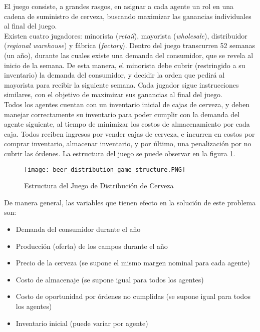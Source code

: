 El juego consiste, a grandes rasgos, en asignar a cada agente un rol en una cadena de suministro de cerveza, buscando maximizar las ganancias individuales al final del juego.\\

Existen cuatro jugadores: minorista (\textit{retail}), mayorista (\textit{wholesale}), distribuidor (\textit{regional warehouse}) y f\'abrica (\textit{factory}). Dentro del juego transcurren 52 semanas (un a\~no), durante las cuales existe una demanda del consumidor, que se revela al inicio de la semana. De esta manera, el minorista debe cubrir (restringido a su inventario) la demanda del consumidor, y decidir la orden que pedir\'a al mayorista para recibir la siguiente semana. Cada jugador sigue instrucciones similares, con el objetivo de maximizar sus ganancias al final del juego.\\

Todos los agentes cuentan con un inventario inicial de cajas de cerveza, y deben manejar correctamente su inventario para poder cumplir con la demanda del agente siguiente, al tiempo de minimizar los costos de almacenamiento por cada caja. Todos reciben ingresos por vender cajas de cerveza, e incurren en costos por comprar inventario, almacenar inventario, y por \'ultimo, una penalizaci\'on por no cubrir las \'ordenes. La estructura del juego se puede observar en la figura \ref{structure}.\\


\begin{figure}[ht]
\label{structure}
\texttt{[image: beer\_distribution\_game\_structure.PNG]}
\caption[Estructura del Juego de Distribución de Cerveza]{Estructura del Juego de Distribución de Cerveza\protect\footnotemark}
\centering
\end{figure}


De manera general, las variables que tienen efecto en la soluci\'on de este problema son:

\begin{itemize}
    \item Demanda del consumidor durante el a\~no
    \item Producci\'on (oferta) de los campos durante el a\~no
    \item Precio de la cerveza (se supone el mismo margen nominal para cada agente)
    \item Costo de almacenaje (se supone igual para todos los agentes)
    \item Costo de oportunidad por \'ordenes no cumplidas (se supone igual para todos los agentes)
    \item Inventario inicial (puede variar por agente)
\end{itemize}

